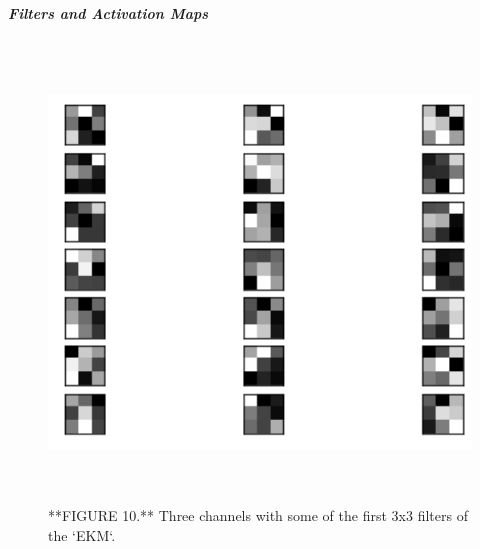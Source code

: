\documentclass[]{article}
\let\oldparagraph\paragraph
\renewcommand{\paragraph}[1]{\oldparagraph{#1}\mbox{}}
\begin{document}
\hypertarget{filters-featuremaps}{%
\paragraph{\texorpdfstring{\emph{Filters and Activation
Maps}}{Filters and Activation Maps}}\label{filters-featuremaps}}

\begin{figure}

{\centering \includegraphics[width=550px,height=460]{Images/FiltersEKM} 

}

\caption{**FIGURE 10.** Three channels with some of the first 3x3 filters of the `EKM`.}\label{fig:filters-ekm}
\end{figure}
\end{document}
